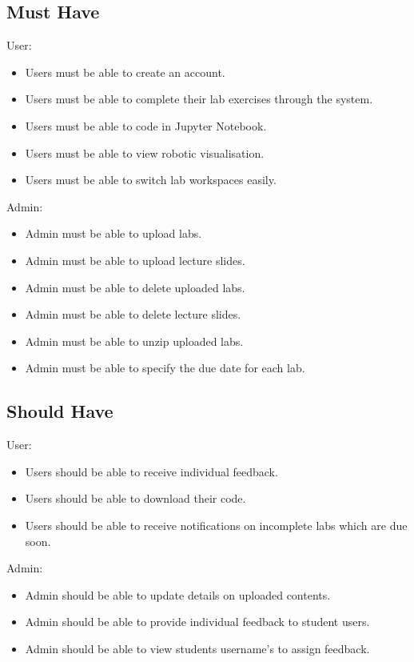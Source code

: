 \documentclass{l4proj}
\begin{document}
\subsection {Must Have}

User:
\begin{itemize}
    \item 
    Users must be able to create an account.
    \item
    Users must be able to complete their lab exercises through the system.
    \item
    Users must be able to code in Jupyter Notebook.
    \item
    Users must be able to view robotic visualisation.
    \item
    Users must be able to switch lab workspaces easily.
\end{itemize}

Admin:

\begin{itemize}
    \item 
    Admin must be able to upload labs.
    \item
    Admin must be able to upload lecture slides.
    \item
    Admin must be able to delete uploaded labs.
     \item
    Admin must be able to delete lecture slides.
     \item
    Admin must be able to unzip uploaded labs.
    \item
    Admin must be able to specify the due date for each lab.
\end{itemize}

\subsection {Should Have}

User:

\begin{itemize}
    \item 
    Users should be able to receive individual feedback.
    \item
    Users should be able to download their code.
    \item
    Users should be able to receive notifications on incomplete labs which are due soon.
\end{itemize}

Admin:

\begin{itemize}
    \item 
    Admin should be able to update details on uploaded contents.
    \item
    Admin should be able to provide individual feedback to student users.
    \item
    Admin should be able to view students username's to assign feedback.
\end{itemize}
\end{document}
